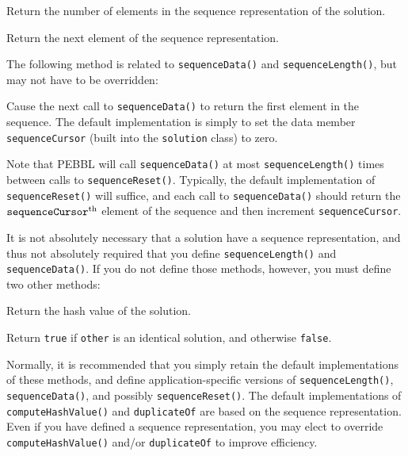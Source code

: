   Return the number of
elements in the sequence representation of the solution.  

 Return the next element of the
sequence representation.

\vspace{2ex}

The following method is related to \texttt{sequenceData()} and
\texttt{sequenceLength()}, but may not have to be overridden:

\vspace{2ex}

 Cause the next call to
\texttt{sequenceData()} to return the first element in the sequence.
The default implementation is simply to set the data member
\texttt{sequenceCursor} (built into the \texttt{solution} class) to
zero.

\vspace{2ex}

Note that PEBBL will call \texttt{sequenceData()} at most
\texttt{sequenceLength()} times between calls to
\texttt{sequenceReset()}.  Typically, the default implementation of
\texttt{sequenceReset()} will suffice, and each call to
\texttt{sequenceData()} should return the
$\text{\texttt{sequenceCursor}}^\text{th}$ element of the sequence and
then increment \texttt{sequenceCursor}.

It is not absolutely necessary that a solution have a sequence
representation, and thus not absolutely required that you define
\texttt{sequenceLength()} and \texttt{sequenceData()}.  If you do not
define those methods, however, you must define two other methods:

\vspace{2ex}

 Return the hash value of the
solution.

 Return \texttt{true} if
\texttt{other} is an identical solution, and otherwise
\texttt{false}. 

\vspace{2ex}

Normally, it is recommended that you simply retain the default
implementations of these methods, and define application-specific
versions of \texttt{sequenceLength()}, \texttt{sequenceData()}, and
possibly \texttt{sequenceReset()}.  The default implementations of
\texttt{computeHashValue()} and \texttt{duplicateOf} are based on the
sequence representation.  Even if you have defined a sequence
representation, you may elect to override \texttt{computeHashValue()}
and/or \texttt{duplicateOf} to improve efficiency.


